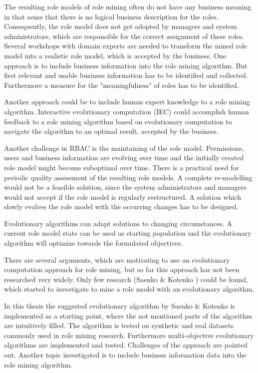 The resulting role models of role mining often do not have any business meaning in that sense that there is no logical business description for the roles. Consequently, the role model does not get adopted by managers and system administrators, which are responsible for the correct assignment of these roles. Several workshops with domain experts are needed to transform the mined role model into a realistic role model, which is accepted by the business. One approach is to include business information into the role mining algorithm. But first relevant and usable business information has to be identified and collected. Furthermore a measure for the "meaningfulness" of roles has to be identified.

Another approach could be to include human expert knowledge to a role mining algorithm. Interactive evolutionary computation (IEC)\cite{949485} could accomplish human feedback to a role mining algorithm based on evolutionary computation to navigate the algorithm to an optimal result, accepted by the business.

Another challenge in RBAC is the maintaining of the role model. Permissions, users and business information are evolving over time and the initially created role model might become suboptimal over time. There is a practical need for periodic quality assessment of the resulting role models\cite{Kunz}. A complete re-modelling would not be a feasible solution, since the system administrators and managers would not accept if the role model is regularly restructured. A solution which slowly evolves the role model with the occurring changes has to be designed.

Evolutionary algorithms can adapt solutions to changing circumstances\cite{Fogel:1997}. A current role model state can be used as starting population and the evolutionary algorithm will optimize towards the formulated objectives.

There are several arguments, which are motivating to use an evolutionary computation approach for role mining, but so far this approach has not been researched very widely. Only few research (Saenko \& Kotenko \cite{Igor}\cite{saenko2012design}) could be found, which started to investigate to mine a role model with an evolutionary algorithm. 

In this thesis the suggested evolutionary algorithm by Saenko \& Kotenko is implemented as a starting point, where the not mentioned parts of the algorithm are intuitively filled. The algorithm is tested on synthetic and real datasets commonly used in role mining research. Furthermore multi-objective evolutionary algorithms are implemented and tested. Challenges of the approach are pointed out. Another topic investigated is to include business information data into the role mining algorithm.

